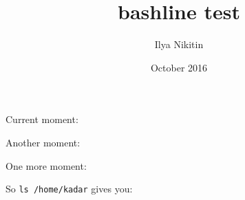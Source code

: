 \documentclass[14pt,a4paper]{extarticle}
\title{bashline test}
\author{Ilya Nikitin}
\date{October 2016}
\begin{document}
    
    Current moment: \hfill  \texttt{\bashdatetime}\par
    Another moment: \hfill  \texttt{\bashdatetime}\par
    One more moment: \hfill \texttt{\bashdatetime}\par
 
    So \texttt{ls  /home/kadar} gives you:\par

%


\bashdate
    
\end{document}
